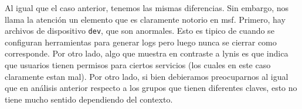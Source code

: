 \documentclass[11pt]{utalcaDoc}
\begin{document}
	
	
	
	
	
	

Al igual que el caso anterior, tenemos las mismas diferencias. Sin embargo, nos llama la atención un elemento que es claramente notorio en msf. Primero, hay archivos de dispositivo \texttt{dev}, que son anormales. Esto es tipico de cuando se configuran herramientas para generar logs pero luego nunca se cierrar como corresponde. Por otro lado, algo que muestra en contraste a lynis es que indica que usuarios tienen permisos para ciertos servicios (los cuales en este caso claramente estan mal).  Por otro lado, si bien debieramos preocuparnos al igual que en análisis anterior respecto a los grupos que tienen diferentes claves, esto no tiene mucho sentido dependiendo del contexto.
\end{document}
